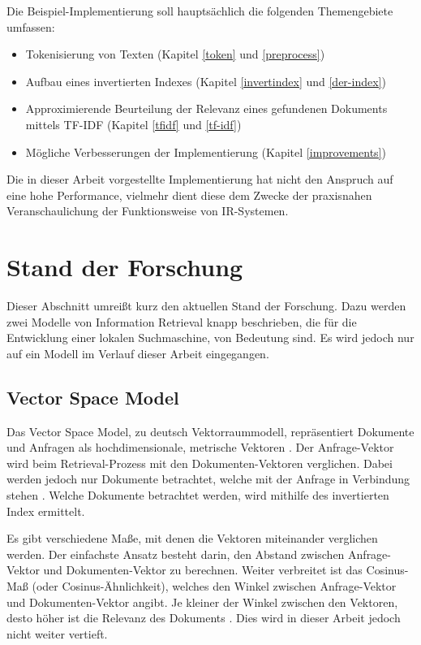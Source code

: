 Die Beispiel-Implementierung soll hauptsächlich die folgenden Themengebiete umfassen:
\begin{itemize}
	\item Tokenisierung von Texten (Kapitel \ref{token} und \ref{preprocess})
	\item Aufbau eines invertierten Indexes (Kapitel \ref{invertindex} und \ref{der-index})
	\item Approximierende Beurteilung der Relevanz eines gefundenen Dokuments mittels TF-IDF (Kapitel \ref{tfidf} und \ref{tf-idf})
	\item Mögliche Verbesserungen der Implementierung (Kapitel \ref{improvements})
\end{itemize}
Die in dieser Arbeit vorgestellte Implementierung hat nicht den Anspruch auf eine hohe Performance, vielmehr dient diese dem Zwecke der praxisnahen Veranschaulichung der Funktionsweise von IR-Systemen.

\section{Stand der Forschung}
Dieser Abschnitt umreißt kurz den aktuellen Stand der Forschung. Dazu werden zwei Modelle von Information Retrieval knapp beschrieben, die für die Entwicklung einer lokalen Suchmaschine, von Bedeutung sind. Es wird jedoch nur auf ein Modell im Verlauf dieser Arbeit eingegangen.

\subsection{Vector Space Model}
Das Vector Space Model, zu deutsch Vektorraummodell, repräsentiert Dokumente und Anfragen als hochdimensionale, metrische Vektoren \cite{VR_Retrieval}.
Der Anfrage-Vektor wird beim Retrieval-Prozess mit den Dokumenten-Vektoren verglichen. Dabei werden jedoch nur Dokumente betrachtet, welche mit der Anfrage in Verbindung stehen \cite{klass_IR}. Welche Dokumente betrachtet werden, wird mithilfe des invertierten Index ermittelt.

Es gibt verschiedene Maße, mit denen die Vektoren miteinander verglichen werden. Der einfachste Ansatz besteht darin, den Abstand zwischen Anfrage-Vektor und Dokumenten-Vektor zu berechnen. Weiter verbreitet ist das Cosinus-Maß (oder Cosinus-Ähnlichkeit), welches den Winkel zwischen Anfrage-Vektor und Dokumenten-Vektor angibt. Je kleiner der Winkel zwischen den Vektoren, desto höher ist die Relevanz des Dokuments \cite{IR_Uni_Duisburg}. Dies wird in dieser Arbeit jedoch nicht weiter vertieft.

